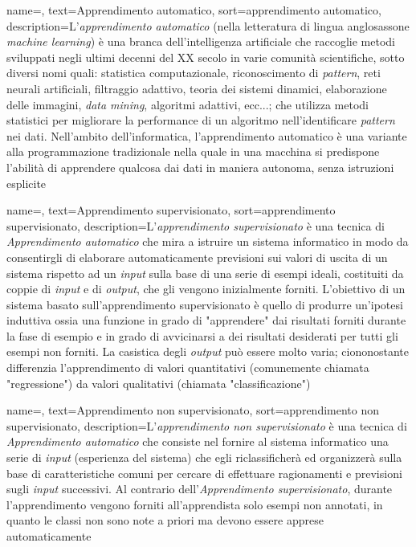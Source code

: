 {
    name=,
    text=Apprendimento automatico,
    sort=apprendimento automatico,
    description={L'\textit{apprendimento automatico} (nella letteratura di lingua anglosassone \textit{machine learning}) è una branca dell'intelligenza artificiale che raccoglie metodi sviluppati negli ultimi decenni del XX secolo in varie comunità scientifiche, sotto diversi nomi quali: statistica computazionale, riconoscimento di \textit{pattern}, reti neurali artificiali, filtraggio adattivo, teoria dei sistemi dinamici, elaborazione delle immagini, \textit{data mining}, algoritmi adattivi, ecc...; che utilizza metodi statistici per migliorare la performance di un algoritmo nell'identificare \textit{pattern} nei dati. Nell'ambito dell'informatica, l'apprendimento automatico è una variante alla programmazione tradizionale nella quale in una macchina si predispone l'abilità di apprendere qualcosa dai dati in maniera autonoma, senza istruzioni esplicite}
}

{
    name=,
    text=Apprendimento supervisionato,
    sort=apprendimento supervisionato,
    description={L'\textit{apprendimento supervisionato} è una tecnica di \textit{\gls{Apprendimento automatico}} che mira a istruire un sistema informatico in modo da consentirgli di elaborare automaticamente previsioni sui valori di uscita di un sistema rispetto ad un \textit{input} sulla base di una serie di esempi ideali, costituiti da coppie di \textit{input} e di \textit{output}, che gli vengono inizialmente forniti. L'obiettivo di un sistema basato sull'apprendimento supervisionato è quello di produrre un'ipotesi induttiva ossia una funzione in grado di "apprendere" dai risultati forniti durante la fase di esempio e in grado di avvicinarsi a dei risultati desiderati per tutti gli esempi non forniti. La casistica degli \textit{output} può essere molto varia; ciononostante differenzia l'apprendimento di valori quantitativi (comunemente chiamata "regressione") da valori qualitativi (chiamata "classificazione")
}
}

{
    name=,
    text=Apprendimento non supervisionato,
    sort=apprendimento non supervisionato,
    description={L'\textit{apprendimento non supervisionato} è una tecnica di \textit{\gls{Apprendimento automatico}} che consiste nel fornire al sistema informatico una serie di \textit{input} (esperienza del sistema) che egli riclassificherà ed organizzerà sulla base di caratteristiche comuni per cercare di effettuare ragionamenti e previsioni sugli \textit{input} successivi. Al contrario dell'\textit{\gls{Apprendimento supervisionato}}, durante l'apprendimento vengono forniti all'apprendista solo esempi non annotati, in quanto le classi non sono note a priori ma devono essere apprese automaticamente
}
}

